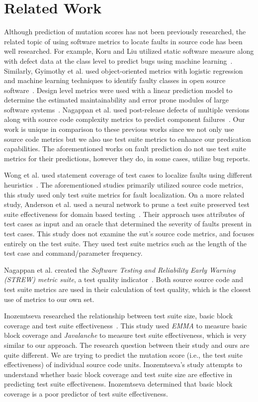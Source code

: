 \section{Related Work}
\label{sec:approach_related_work}
Although prediction of mutation scores has not been previously researched, the related topic of using software metrics to locate faults in source code has been well researched. For example, Koru and Liu utilized static software measure along with defect data at the class level to predict bugs using machine learning~\cite{KL05}. Similarly, Gyimothy et al. used object-oriented metrics with logistic regression and machine learning techniques to identify faulty classes in open source software~\cite{GFS05}. Design level metrics were used with a linear prediction model to determine the estimated maintainability and error prone modules of large software systems~\cite{MKPS00}. Nagappan et al. used post-release defects of multiple versions along with source code complexity metrics to predict component failures~\cite{NBZ06}. Our work is unique in comparison to these previous works since we not only use source code metrics but we also use test suite metrics to enhance our predication capabilities. The aforementioned works on fault prediction do not use test suite metrics for their predictions, however they do, in some cases, utilize bug reports.

Wong et al. used statement coverage of test cases to localize faults using different heuristics~\cite{WDC10}. The aforementioned studies primarily utilized source code metrics, this study used only test suite metrics for fault localization. On a more related study, Anderson et al. used a neural network to prune a test suite preserved test suite effectiveness for domain based testing~\cite{AMM95}. Their approach uses attributes of test cases as input and an oracle that determined the severity of faults present in test cases. This study does not examine the \gls{sut}'s source code metrics, and focuses entirely on the test suite. They used test suite metrics such as the length of the test case and command/parameter frequency.

Nagappan et al. created the \emph{Software Testing and Reliability Early Warning (STREW) metric suite}, a test quality indicator~\cite{NWO+05, NWVO05}. Both source source code and test suite metrics are used in their calculation of test quality, which is the closest use of metrics to our own set.

Inozemtseva researched the relationship between test suite size, basic block coverage and test suite effectiveness~\cite{Ino12}. This study used \emph{EMMA} to measure basic block coverage and \emph{Javalanche} to measure test suite effectiveness, which is very similar to our approach. The research question between their study and ours are quite different. We are trying to predict the mutation score (i.e., the test suite effectiveness) of individual source code units. Inozemtseva's study attempts to understand whether basic block coverage and test suite size are effective in predicting test suite effectiveness. Inozemtseva determined that basic block coverage is a poor predictor of test suite effectiveness. 


